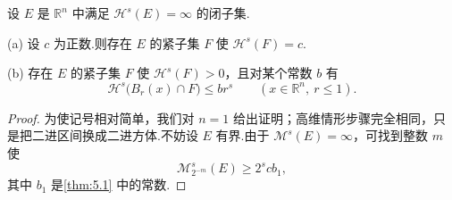 \begin{theorem}\label{thm:5.4}
设 $E$ 是 $\mathbb{R}^n$ 中满足 $\mathcal{H}^s(E)=\infty$ 的闭子集.

(a) 设 $c$ 为正数.则存在 $E$ 的紧子集 $F$ 使 $\mathcal{H}^s(F)=c$.

(b) 存在 $E$ 的紧子集 $F$ 使 $\mathcal{H}^s(F)>0$，且对某个常数 $b$ 有
\[
  \mathcal{H}^{s}\bigl(B_r(x)\cap F\bigr)\leq br^{s}\qquad(x\in\mathbb{R}^n,\ r\leq 1).
\]
\end{theorem}

\begin{proof}
为使记号相对简单，我们对 $n=1$ 给出证明；高维情形步骤完全相同，只是把二进区间换成二进方体.不妨设 $E$ 有界.由于 $\mathcal{M}^s(E)=\infty$，可找到整数 $m$ 使
\[
  \mathcal{M}^{s}_{2^{-m}}(E)\geq 2^{s}cb_1,
\]
其中 $b_1$ 是\cref{thm:5.1} 中的常数.


\end{proof}
